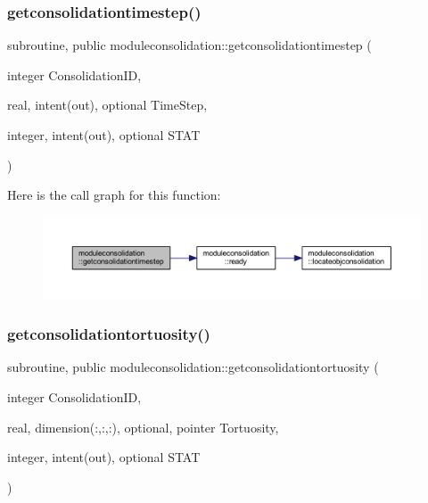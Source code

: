 \subsubsection{\texorpdfstring{getconsolidationtimestep()}{getconsolidationtimestep()}}
{\footnotesize\ttfamily subroutine, public moduleconsolidation\+::getconsolidationtimestep (\begin{DoxyParamCaption}\item[{integer}]{Consolidation\+ID,  }\item[{real, intent(out), optional}]{Time\+Step,  }\item[{integer, intent(out), optional}]{S\+T\+AT }\end{DoxyParamCaption})}

Here is the call graph for this function\+:\nopagebreak
\begin{figure}[H]
\begin{center}
\leavevmode
\includegraphics[width=350pt]{namespacemoduleconsolidation_a529ccec5bab61ec53a0993230d6bb49c_cgraph}
\end{center}
\end{figure}
\mbox{\label{namespacemoduleconsolidation_a6f6333d1cd3299be92039f6e03e3b5b8}} 
\subsubsection{\texorpdfstring{getconsolidationtortuosity()}{getconsolidationtortuosity()}}
{\footnotesize\ttfamily subroutine, public moduleconsolidation\+::getconsolidationtortuosity (\begin{DoxyParamCaption}\item[{integer}]{Consolidation\+ID,  }\item[{real, dimension(\+:,\+:,\+:), optional, pointer}]{Tortuosity,  }\item[{integer, intent(out), optional}]{S\+T\+AT }\end{DoxyParamCaption})}

